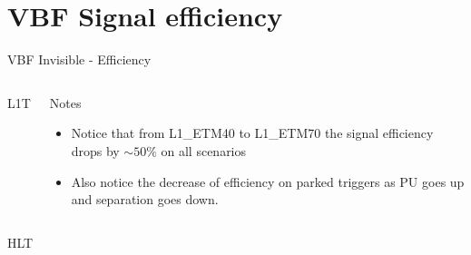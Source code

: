 \documentclass[8pt]{beamer}
\begin{document}
\section{VBF Signal efficiency}

\begin{frame}{VBF Invisible - Efficiency}

\begin{columns}

\begin{block}{L1T}
\centering

\resizebox{1.0\linewidth}{!}{

}
\end{block}

\begin{block}{Notes}
 
\begin{itemize}
  \item Notice that from L1\_ETM40 to L1\_ETM70 the signal efficiency drops by $\sim50\%$ on all scenarios
  \item Also notice the decrease of efficiency on parked triggers as PU goes up and separation goes down.
\end{itemize}
 
\end{block}

\end{columns}

\begin{block}{HLT}
\centering
 
\resizebox{0.8\linewidth}{!}{  }

\end{block}

\end{frame}
\end{document}

